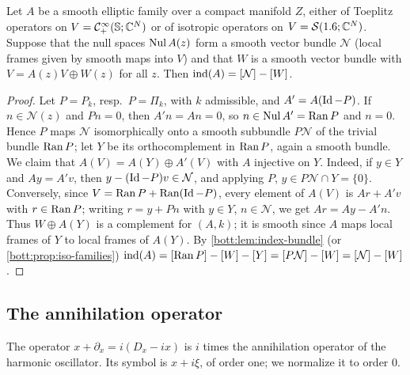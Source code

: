 \begin{lemma}\label{bott:lem:null-complement}
  Let $A$ be a smooth elliptic family over a compact manifold $Z$, either of Toeplitz
  operators on $V=\mathcal{C}^\infty_+(\mathbb{S};\mathbb{C}^N)$ or of isotropic operators on $V=\mathcal{S}(1.6;\mathbb{C}^N)$.
  Suppose that the null spaces $\operatorname{Nul} A(z)$ form a smooth vector bundle $\mathcal N$
  (local frames given by smooth maps into $V$) and that $W$ is a smooth vector bundle
  with $V=A(z)V\oplus W(z)$ for all $z$. Then $\operatorname{ind}(A)=[\mathcal N]-[W]$.
\end{lemma}
\begin{proof}
  Let $P=P_k$, resp.\ $P=\Pi_k$, with $k$ admissible, and $A'=A(\operatorname{Id}-P)$. If
  $n\in\mathcal N(z)$ and $Pn=0$, then $A'n=An=0$, so $n\in\operatorname{Nul} A'=\operatorname{Ran} P$ and $n=0$.
  Hence $P$ maps $\mathcal N$ isomorphically onto a smooth subbundle $P\mathcal N$ of
  the trivial bundle $\operatorname{Ran} P$; let $Y$ be its orthocomplement in $\operatorname{Ran} P$, again a
  smooth bundle. We claim that $A(V)=A(Y)\oplus A'(V)$ with $A$ injective on $Y$. Indeed,
  if $y\in Y$ and $Ay=A'v$, then $y-(\operatorname{Id}-P)v\in\mathcal N$, and applying $P$,
  $y\in P\mathcal N\cap Y=\{0\}$. Conversely, since $V=\operatorname{Ran} P+\operatorname{Ran}(\operatorname{Id}-P)$, every element
  of $A(V)$ is $Ar+A'v$ with $r\in\operatorname{Ran} P$; writing $r=y+Pn$ with $y\in Y$,
  $n\in\mathcal N$, we get $Ar=Ay-A'n$. Thus $W\oplus A(Y)$ is a complement for $(A,k)$;
  it is smooth since $A$ maps local frames of $Y$ to local frames of $A(Y)$. By
  \cref{bott:lem:index-bundle} (or \cref{bott:prop:iso-families})
  $\operatorname{ind}(A)=[\operatorname{Ran} P]-[W]-[Y]=[P\mathcal N]-[W]=[\mathcal N]-[W]$.
\end{proof}

\subsection{The annihilation operator}
The operator $x+\partial_x=i(D_x-ix)$ is $i$ times the annihilation operator of the
harmonic oscillator. Its symbol is $x+i\xi$, of order one; we normalize it to order
$0$.

